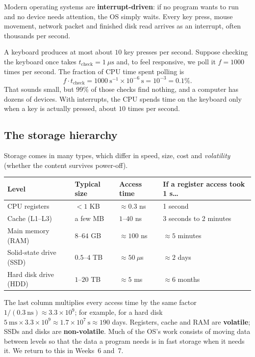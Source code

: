 \documentclass[11pt,a4paper]{article}
\begin{document}
Modern operating systems are \textbf{interrupt-driven}: if no program wants to run and no device needs attention, the OS simply waits. Every key press, mouse movement, network packet and finished disk read arrives as an interrupt, often thousands per second.

\begin{example}
A keyboard produces at most about $10$ key presses per second. Suppose checking the keyboard once takes $t_{\text{check}} = 1\ \mu\text{s}$ and, to feel responsive, we poll it $f = 1000$ times per second. The fraction of CPU time spent polling is
\[
f \cdot t_{\text{check}} = 1000\ \text{s}^{-1} \times 10^{-6}\ \text{s} = 10^{-3} = 0.1\%.
\]
That sounds small, but $99\%$ of those checks find nothing, and a computer has dozens of devices. With interrupts, the CPU spends time on the keyboard only when a key is actually pressed, about $10$ times per second.
\end{example}

\subsection{The storage hierarchy}

Storage comes in many types, which differ in speed, size, cost and \emph{volatility} (whether the content survives power-off).

\begin{center}
\renewcommand{\arraystretch}{1.3}
\begin{tabular}{@{}llll@{}}
\toprule
\textbf{Level} & \textbf{Typical size} & \textbf{Access time} & \textbf{If a register access took 1 s\dots} \\
\midrule
CPU registers & $< 1$ KB & $\approx 0.3$ ns & 1 second \\
Cache (L1--L3) & a few MB & $1$--$40$ ns & 3 seconds to 2 minutes \\
Main memory (RAM) & $8$--$64$ GB & $\approx 100$ ns & $\approx 5$ minutes \\
Solid-state drive (SSD) & $0.5$--$4$ TB & $\approx 50\ \mu$s & $\approx 2$ days \\
Hard disk drive (HDD) & $1$--$20$ TB & $\approx 5$ ms & $\approx 6$ months \\
\bottomrule
\end{tabular}
\end{center}

The last column multiplies every access time by the same factor $1/(0.3\ \text{ns}) \approx 3.3\times10^{9}$; for example, for a hard disk $5\ \text{ms} \times 3.3\times10^{9} \approx 1.7\times10^{7}\ \text{s} \approx 190$ days. Registers, cache and RAM are \textbf{volatile}; SSDs and disks are \textbf{non-volatile}. Much of the OS's work consists of moving data between levels so that the data a program needs is in fast storage when it needs it. We return to this in Weeks~6 and~7.
\end{document}
